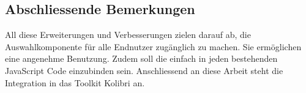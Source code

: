 \subsection{Abschliessende Bemerkungen}
\label{sec:endSumup}

All diese Erweiterungen und Verbesserungen zielen darauf ab, die Auswahlkomponente für alle Endnutzer zugänglich zu machen. 
Sie ermöglichen eine angenehme Benutzung. 
Zudem soll die  einfach in jeden bestehenden JavaScript Code einzubinden sein. 
Anschliessend an diese Arbeit steht die Integration in das Toolkit Kolibri an. 
